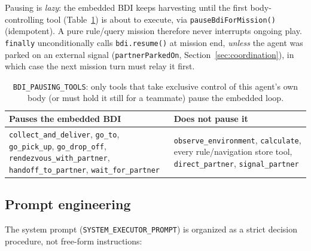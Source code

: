 \documentclass[11pt,a4paper]{article}
\begin{document}
Pausing is \emph{lazy}: the embedded BDI keeps harvesting until the first body-controlling tool
(Table~\ref{tab:bdi-pausing}) is about to execute, via \texttt{pauseBdiForMission()} (idempotent).
A pure rule/query mission therefore never interrupts ongoing play. \texttt{finally}
unconditionally calls \texttt{bdi.resume()} at mission end, \emph{unless} the agent was parked on
an external signal (\texttt{partnerParkedOn}, Section~\ref{sec:coordination}), in which case the
next mission turn must relay it first.

\begin{table}[htbp]
\centering
\footnotesize
\begin{tabular}{@{}p{6.0cm}p{6.0cm}@{}}
\toprule
\textbf{Pauses the embedded BDI} & \textbf{Does not pause it} \\
\midrule
\texttt{collect\_and\_deliver}, \texttt{go\_to}, \texttt{go\_pick\_up}, \texttt{go\_drop\_off},
\texttt{rendezvous\_with\_partner}, \texttt{handoff\_to\_partner}, \texttt{wait\_for\_partner} &
\texttt{observe\_environment}, \texttt{calculate}, every rule/navigation store tool,
\texttt{direct\_partner}, \texttt{signal\_partner} \\
\bottomrule
\end{tabular}
\caption{\texttt{BDI\_PAUSING\_TOOLS}: only tools that take exclusive control of this agent's
own body (or must hold it still for a teammate) pause the embedded loop.}
\label{tab:bdi-pausing}
\end{table}

\subsection{Prompt engineering}

The system prompt (\texttt{SYSTEM\_EXECUTOR\_PROMPT}) is organized as a strict decision
procedure, not free-form instructions:
\end{document}
